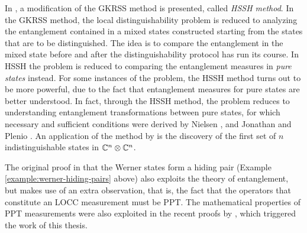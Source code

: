In \cite{Horodecki03}, a modification of the GKRSS method is presented, 
called \emph{HSSH method}. In the GKRSS method, the local distinguishability 
problem is reduced to analyzing the entanglement contained in a mixed states
constructed starting from the states that are to be distinguished.
The idea is to compare the entanglement in the mixed state before and after 
the distinguishability protocol has run its course.
In HSSH the problem is reduced to comparing the entanglement measures in 
\emph{pure states} instead. For some instances of the problem, the HSSH method
turns out to be more powerful, due to the fact that entanglement measures for 
pure states are better understood. In fact, through the HSSH method, the problem reduces 
to understanding entanglement transformations between pure states,   
for which necessary and sufficient conditions were derived by Nielsen \cite{Nielsen99}, and
Jonathan and Plenio \cite{Jonathan99}.
An application of the method by \cite{Horodecki03} is the discovery of the first 
set of $n$ indistinguishable states in $\mathbb{C}^{n}\otimes\mathbb{C}^{n}$.

The original proof in \cite{Terhal01a} that the Werner states form a hiding pair 
(Example \ref{example:werner-hiding-pairs} above) also exploits the theory of entanglement,
but makes use of an extra observation, that is, the fact that the operators 
that constitute an LOCC measurement must be PPT.
The mathematical properties of PPT measurements were also exploited in the recent 
proofs by \cite{Yu12,Yu14}, which triggered the work of this thesis.



